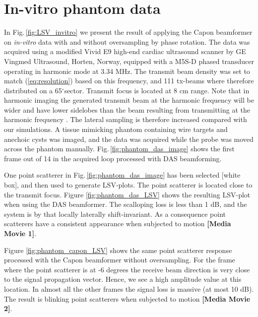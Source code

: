 \documentclass[draftcls]{IEEEtran}
\newcommand{\degree}{\ensuremath{^\circ}}
\newcommand\multimedia[1]{\textbf{{\color{red}[#1]}}}
\begin{document}
\section{In-vitro phantom data}\label{sec:res}
In Fig.\,\ref{fig:LSV_invitro} we present the result of applying the Capon beamformer on \textit{in-vitro} data with and without oversampling by phase rotation. The data was acquired using a modified Vivid E9 high-end cardiac ultrasound scanner by GE Vingmed Ultrasound, Horten, Norway, equipped with a M5S-D phased transducer operating in harmonic mode at 3.34 MHz. The transmit beam density was set to match (\ref{eq:resolution}) based on this frequency, and 111 tx-beams where therefore distributed on a 65\degree sector. Transmit focus is located at 8 cm range. Note that in harmonic imaging the generated transmit beam at the harmonic frequency will be wider and have lower sidelobes than the beam resulting from transmitting at the harmonic frequency \cite{Fedewa2004}. The lateral sampling is therefore increased compared with our simulations. A tissue mimicking phantom containing wire targets and anechoic cysts was imaged, and the data was acquired while the probe was moved across the phantom manually. Fig.\,\ref{fig:phantom_das_image} shows the first frame out of 14 in the acquired loop processed with DAS beamforming. %

One point scatterer in Fig.\,\ref{fig:phantom_das_image} has been selected [white box], and then used to generate LSV-plots. The point scatterer is located close to the transmit focus. Figure \ref{fig:phantom_das_LSV} shows the resulting LSV-plot when using the DAS beamformer. The scalloping loss is less than 1 dB, and the system is by that locally laterally shift-invariant. As a consequence point scatterers have a consistent appearance when subjected to motion \multimedia{Media Movie 1}.  

Figure \ref{fig:phantom_capon_LSV} shows the same point scatterer response processed with the Capon beamformer without oversampling. For the frame where the point scatterer is at -6 degrees the receive beam direction is very close to the signal propagation vector. Hence, we see a high amplitude value at this location. In almost all the other frames the signal loss is massive (at most 10 dB). The result is blinking point scatterers when subjected to motion \multimedia{Media Movie 2}. 
\end{document}

